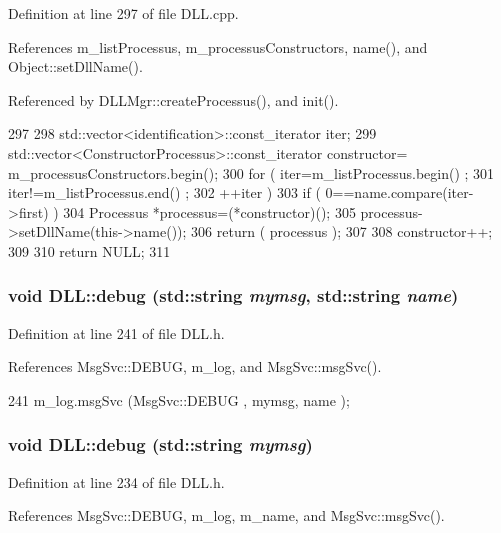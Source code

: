 Definition at line 297 of file DLL.cpp.

References m\_\-listProcessus, m\_\-processusConstructors, name(), and Object::setDllName().

Referenced by DLLMgr::createProcessus(), and init().


\begin{DoxyCode}
297                                                  {
298   std::vector<identification>::const_iterator iter;
299   std::vector<ConstructorProcessus>::const_iterator constructor=
      m_processusConstructors.begin();
300   for ( iter=m_listProcessus.begin() ;
301         iter!=m_listProcessus.end() ;
302         ++iter ) {
303     if ( 0==name.compare(iter->first) ){
304       Processus *processus=(*constructor)();
305       processus->setDllName(this->name());
306       return ( processus );
307     }
308     constructor++;
309   }
310   return NULL;
311 }
\end{DoxyCode}
\hypertarget{classDLL_a681470b03d31aab77229bb2e3a72409c}{
\subsubsection[{debug}]{\setlength{\rightskip}{0pt plus 5cm}void DLL::debug (std::string {\em mymsg}, \/  std::string {\em name})}}
\label{classDLL_a681470b03d31aab77229bb2e3a72409c}


Definition at line 241 of file DLL.h.

References MsgSvc::DEBUG, m\_\-log, and MsgSvc::msgSvc().


\begin{DoxyCode}
241 { m_log.msgSvc (MsgSvc::DEBUG   , mymsg, name ); }
\end{DoxyCode}
\hypertarget{classDLL_ab3fb4a13b4308047d42b27b6943a47da}{
\subsubsection[{debug}]{\setlength{\rightskip}{0pt plus 5cm}void DLL::debug (std::string {\em mymsg})}}
\label{classDLL_ab3fb4a13b4308047d42b27b6943a47da}


Definition at line 234 of file DLL.h.

References MsgSvc::DEBUG, m\_\-log, m\_\-name, and MsgSvc::msgSvc().

